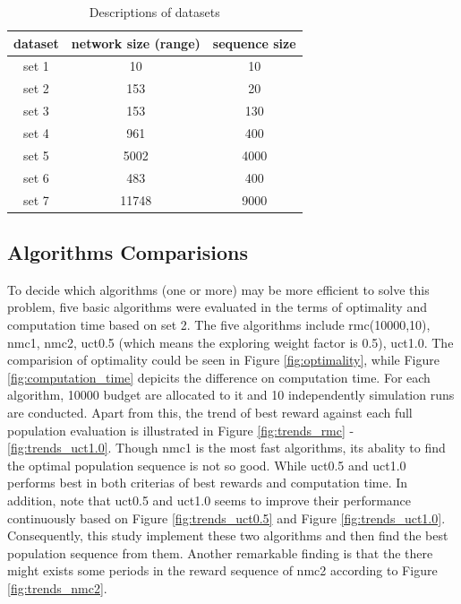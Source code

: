 \documentclass{article}
\begin{document}
\begin{table}[htbp]
  \centering
  \caption{Descriptions of datasets}
    \begin{tabular}{ccc}
    \toprule
    dataset & network size (range) & sequence size \\
    \midrule
    set 1 & 10 & 10 \\
    set 2 & 153 & 20 \\
    set 3 & 153 & 130 \\
    set 4 & 961 & 400 \\
    set 5 & 5002 & 4000 \\
    set 6 & 483 & 400 \\
    set 7 & 11748 & 9000 \\
    \bottomrule
    \end{tabular}%
  \label{tab:datasets}%
\end{table}%

\subsection{Algorithms Comparisions}
To decide which algorithms (one or more) may be more efficient to solve this problem, five basic algorithms were evaluated in the terms of optimality and computation time based on set 2. The five algorithms include rmc(10000,10), nmc1, nmc2, uct0.5 (which means the exploring weight factor is 0.5), uct1.0. The comparision of optimality could be seen in Figure \ref{fig:optimality}, while Figure \ref{fig:computation_time} depicits the difference on computation time. For each algorithm, 10000 budget are allocated to it and 10 independently simulation runs are conducted. Apart from this, the trend of best reward against each full population evaluation is illustrated in Figure \ref{fig:trends_rmc} - \ref{fig:trends_uct1.0}. Though nmc1 is the most fast algorithms, its abality to find the optimal population sequence is not so good. While uct0.5 and uct1.0 performs best in both criterias of best rewards and computation time. In addition, note that uct0.5 and uct1.0 seems to improve their performance continuously based on Figure \ref{fig:trends_uct0.5} and Figure \ref{fig:trends_uct1.0}. Consequently, this study implement these two algorithms and then find the best population sequence from them. Another remarkable finding is that the there might exists some periods in the reward sequence of nmc2 according to Figure \ref{fig:trends_nmc2}.
\end{document}
